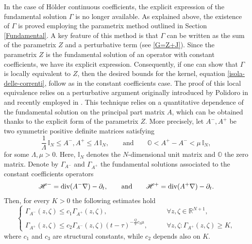 \documentclass[11pt,a4paper]{article}
\numberwithin{equation}{section}
\def \rnn {{\mathbb {R}}^{N+1}}
\def \div {{\text{\rm div}}}
\def \p {\partial}
\def \G {{\Gamma}}
\def \t {{\tau}}
\def \z {{\zeta}}
\begin{document}
{{In the case of H\"older continuous coefficients, the explicit expression of the fundamental solution $\G$ is no longer available. As explained above, the existence of $\Gamma$ is proved employing the parametrix method outlined in Section \ref{Fundamental}. A key feature of this method is that $\G$ can be written as the sum of the parametrix $Z$ and a perturbative term (see \eqref{G=Z+J}). Since the parametrix $Z$ is the fundamental solution  of an operator with constant coefficients, we have its explicit expression. Consequently, if one can show that $\Gamma$ is locally equivalent to $Z$, then the desired bounds for the kernel, equation \eqref{isola-delle-correnti}, follow as in the constant coefficients case. The proof of this local equivalence relies on a perturbative argument originally introduced by Polidoro in \cite{polidoro-parametrix} and recently employed in \cite{rebucci24}. This technique relies on a quantitative dependence of the fundamental solution on the principal part matrix $A$, which can be obtained thanks to the explicit form of the parametrix $Z$. More precisely, let $A^-, A^+$ be two symmetric positive definite matrices satisfying
\begin{equation}
	\frac{1}{\Lambda} \,\mathbb{I}_{N}\leq A^-,A^+\leq \Lambda \, \mathbb{I}_{N},\qquad \text{and} \qquad \mathbb{O}<A^+-A^-<\mu \, \mathbb{I}_{N},
\end{equation}
for some $\Lambda,\mu>0$. Here, $\mathbb{I}_{N}$ denotes the $N$-dimensional unit matrix and $\mathbb{O}$ the zero matrix. Denote by $\G_{A^{-}}$ and $\G_{A^{+}}$ the fundamental solutions associated to the constant coefficients operators
\begin{equation}
	\mathscr H^-=\div (A^-\nabla)-\p_t,\qquad \text{and}\qquad \mathscr H^+=\div (A^+\nabla)-\p_t.
\end{equation}
Then, for every $K>0$  the following estimates hold 
\begin{equation}\label{double-estimates}
	\begin{cases}
		\G_{A^-}(z,\z)\leq c_1\G_{A^+}(z,\z),\qquad &\forall z,\z \in \rnn,\\
		\G_{A^+}(z,\z)\leq c_2\G_{A^-}(z,\z)(t-\t)^{-\frac{Q}{2}c_3\mu},\qquad &\forall z,\z : \G_{A^+}(z,\z)\geq K,
	\end{cases}
\end{equation}
where $c_1$ and $c_3$ are structural constants, while $c_2$ depends also on $K$. 

\medskip

}}
\end{document}
